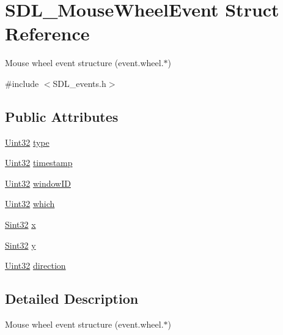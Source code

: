 \hypertarget{struct_s_d_l___mouse_wheel_event}{}\section{S\+D\+L\+\_\+\+Mouse\+Wheel\+Event Struct Reference}
\label{struct_s_d_l___mouse_wheel_event}


Mouse wheel event structure (event.\+wheel.$\ast$)  




{\ttfamily \#include $<$S\+D\+L\+\_\+events.\+h$>$}

\subsection*{Public Attributes}
\begin{DoxyCompactItemize}
\item 
\mbox{\hyperlink{_s_d_l__stdinc_8h_add440eff171ea5f55cb00c4a9ab8672d}{Uint32}} \mbox{\hyperlink{struct_s_d_l___mouse_wheel_event_aa6b741e99df708c6f9550ee0f520fb70}{type}}
\item 
\mbox{\hyperlink{_s_d_l__stdinc_8h_add440eff171ea5f55cb00c4a9ab8672d}{Uint32}} \mbox{\hyperlink{struct_s_d_l___mouse_wheel_event_a83ad52c80ff49a8e75dc6c33bba65fa0}{timestamp}}
\item 
\mbox{\hyperlink{_s_d_l__stdinc_8h_add440eff171ea5f55cb00c4a9ab8672d}{Uint32}} \mbox{\hyperlink{struct_s_d_l___mouse_wheel_event_ab45eb1895217214ecb773fc555e08f6c}{window\+ID}}
\item 
\mbox{\hyperlink{_s_d_l__stdinc_8h_add440eff171ea5f55cb00c4a9ab8672d}{Uint32}} \mbox{\hyperlink{struct_s_d_l___mouse_wheel_event_a014dc767d52e8b75ba26a5f12e1704e8}{which}}
\item 
\mbox{\hyperlink{_s_d_l__stdinc_8h_a7a90b941db9d4582e9ad7abb9940ff7e}{Sint32}} \mbox{\hyperlink{struct_s_d_l___mouse_wheel_event_a6d904eef474ea45a5b1828fcb5b0f859}{x}}
\item 
\mbox{\hyperlink{_s_d_l__stdinc_8h_a7a90b941db9d4582e9ad7abb9940ff7e}{Sint32}} \mbox{\hyperlink{struct_s_d_l___mouse_wheel_event_a53fdf77a464426bc8b30e629795f044b}{y}}
\item 
\mbox{\hyperlink{_s_d_l__stdinc_8h_add440eff171ea5f55cb00c4a9ab8672d}{Uint32}} \mbox{\hyperlink{struct_s_d_l___mouse_wheel_event_a9fc46552d116499e5b8ca89d66df932c}{direction}}
\end{DoxyCompactItemize}


\subsection{Detailed Description}
Mouse wheel event structure (event.\+wheel.$\ast$) 


